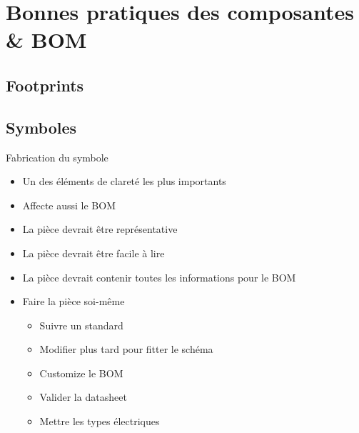 

\section{Bonnes pratiques des composantes \& BOM}

\subsection{Footprints}



\subsection{Symboles}

\begin{frame}{Fabrication du symbole}
    \begin{twocolumns}[0.6]
        \leftcol
        \begin{itemize}
            \item Un des éléments de clareté les plus importants
            \item Affecte aussi le BOM
            \bigskip
            \item La pièce devrait être représentative
            \item La pièce devrait être facile à lire
            \item La pièce devrait contenir toutes les informations pour le BOM
            \bigskip
            \item Faire la pièce soi-même
            \begin{itemize}
                \item Suivre un standard
                \item Modifier plus tard pour fitter le schéma
                \item Customize le BOM
                \item Valider la datasheet
                \item Mettre les types électriques
            \end{itemize}
        \end{itemize}

        \rightcol
    \end{twocolumns}
\end{frame}

